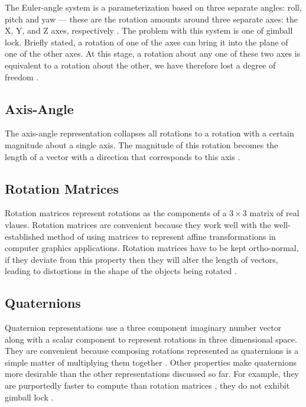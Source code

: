 \documentclass{acm_proc_article-sp}
\begin{document}
The Euler-angle system is a parameterization based on three separate angles: roll, pitch and yaw --- these are the rotation amounts around three separate axes: the X, Y, and Z axes, respectively \cite{diebel06}.
The problem with this system is one of gimball lock.
Briefly stated, a rotation of one of the axes can bring it into the plane of one of the other axes.
At this stage, a rotation about any one of these two axes is equivalent to a rotation about the other, we have therefore lost a degree of freedom \cite{pletinckx89}.

\subsection{Axis-Angle}

The axis-angle representation collapses all rotations to a rotation with a certain magnitude about a single axis.
The magnitude of this rotation becomes the length of a vector with a direction that corresponds to this axis \cite{diebel06}.

\subsection{Rotation Matrices}

Rotation matrices represent rotations as the components of a $3 \times 3$ matrix of real vlaues.
Rotation matrices are convenient because they work well with the well-established method of using matrices to represent affine transformations in computer graphics applications.
Rotation matrices have to be kept ortho-normal, if they deviate from this property then they will alter the length of vectors, leading to distortions in the shape of the objects being rotated \cite{diebel06}.

\subsection{Quaternions}

Quaternion representations use a three component imaginary number vector along with a scalar component to represent rotations in three dimensional space.
They are convenient because composing rotations represented as quaternions is a simple matter of multiplying them together \cite{schoemake85}.
Other properties make quaternions more desirable than the other representations discussed so far.
For example, they are purportedly faster to compute than rotation matrices \cite{taylor79}, they do not exhibit gimball lock \cite{schoemake85}.
\end{document}
